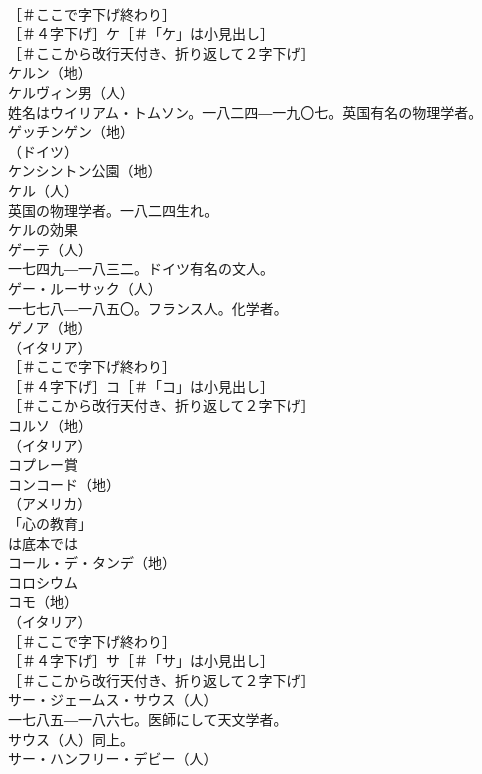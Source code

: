 \documentclass[8pt]{extreport}
\begin{document}
\begin{CJK}{UTF8}{min}
\\	［＃ここで字下げ終わり］
\\	［＃４字下げ］ケ［＃「ケ」は小見出し］
\\	［＃ここから改行天付き、折り返して２字下げ］
\\	ケルン（地）
\\	ケルヴィン男（人）
\\	姓名はウイリアム・トムソン。一八二四―一九〇七。英国有名の物理学者。
\\	ゲッチンゲン（地）
\\	（ドイツ）
\\	ケンシントン公園（地）
\\	ケル（人）
\\	英国の物理学者。一八二四生れ。
\\	ケルの効果 
\\	ゲーテ（人）
\\	一七四九―一八三二。ドイツ有名の文人。
\\	ゲー・ルーサック（人）
\\	一七七八―一八五〇。フランス人。化学者。
\\	ゲノア（地）
\\	（イタリア）
\\	［＃ここで字下げ終わり］
\\	［＃４字下げ］コ［＃「コ」は小見出し］
\\	［＃ここから改行天付き、折り返して２字下げ］
\\	コルソ（地）
\\	（イタリア）
\\	コプレー賞 
\\	コンコード（地）
\\	（アメリカ）
\\	「心の教育」 
\\	は底本では
\\	コール・デ・タンデ（地）
\\	コロシウム 
\\	コモ（地）
\\	（イタリア）
\\	［＃ここで字下げ終わり］
\\	［＃４字下げ］サ［＃「サ」は小見出し］
\\	［＃ここから改行天付き、折り返して２字下げ］
\\	サー・ジェームス・サウス（人）
\\	一七八五―一八六七。医師にして天文学者。
\\	サウス（人）同上。
\\	サー・ハンフリー・デビー（人）

\end{CJK}
\end{document}
